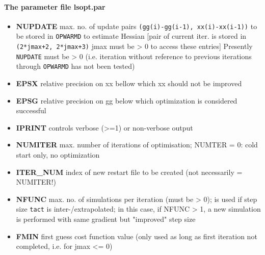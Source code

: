 \paragraph{The parameter file lsopt.par}

%
\begin{itemize}
%
\item {\bf NUPDATE}
max. no. of update pairs {\tt (gg(i)-gg(i-1), xx(i)-xx(i-1))}
to be stored in {\tt OPWARMD} to estimate Hessian
[pair of current iter. is stored in 
{\tt (2*jmax+2, 2*jmax+3)}
jmax must be > 0 to access these entries]
Presently {\tt NUPDATE} must be > 0 
(i.e. iteration without reference to previous
 iterations through {\tt OPWARMD} has not been tested)
%
\item {\bf EPSX}
relative precision on xx bellow which xx should not be improved
%
\item {\bf EPSG}
relative precision on gg below which optimization is 
considered successful
%
\item {\bf IPRINT}
controls verbose (>=1) or non-verbose output
%
\item {\bf NUMITER}
max. number of iterations of optimisation;
NUMTER = 0: cold start only, no optimization
%
\item {\bf ITER\_NUM}
index of new restart file to be created (not necessarily = NUMITER!)
%
\item {\bf NFUNC}
max. no. of simulations per iteration
(must be > 0);
is used if step size {\tt tact} is inter-/extrapolated;
in this case, if NFUNC > 1, a new simulation is performed with
same gradient but "improved" step size
%
\item {\bf FMIN}
first guess cost function value
(only used as long as first iteration not completed,
i.e. for jmax <= 0)
%
\end{itemize}

